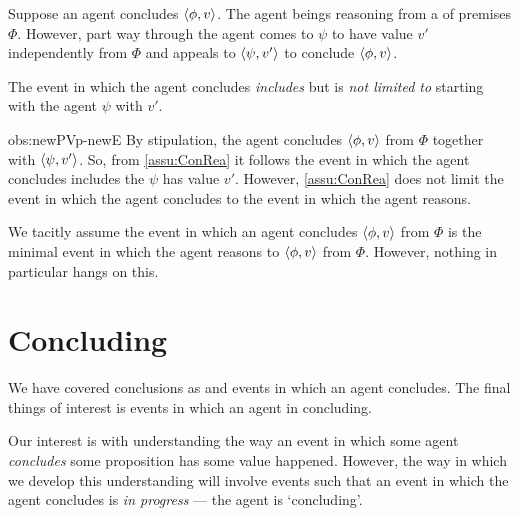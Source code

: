 \begin{note}
  \begin{observation}[Bounds]%
    \label{obs:newPVp-newE}%
    Suppose an agent concludes \(\langle \phi, v \rangle\).
    The agent beings reasoning from a \pool{} of premises \(\Phi\).
    However, part way through the agent comes to \eval{} \(\psi\) to have value \(v'\) independently from \(\Phi\) and appeals to \(\langle \psi, v' \rangle\) to conclude \(\langle \phi, v \rangle\).

    The event in which the agent concludes \emph{includes} but is \emph{not limited to} starting with the agent \evaling{} \(\psi\) with \(v'\).
  \end{observation}

  \begin{motivation}{obs:newPVp-newE}%
    By stipulation, the agent concludes \(\langle \phi, v \rangle\) from \(\Phi\) together with \(\langle \psi, v' \rangle\).
    So, from \autoref{assu:ConRea} it follows the event in which the agent concludes includes the \evalion{} \(\psi\) has value \(v'\).
    However, \autoref{assu:ConRea} does not limit the event in which the agent concludes to the event in which the agent reasons.
  \end{motivation}

  We tacitly assume the event in which an agent concludes \(\langle \phi, v \rangle\) from \(\Phi\) is the minimal event in which the agent reasons to \(\langle \phi, v \rangle\) from \(\Phi\).
  However, nothing in particular hangs on this.
\end{note}

\section{Concluding}
\label{cha:clar:sec:Cing}

\begin{note}
  We have covered conclusions as  and events in which an agent concludes.
  The final things of interest is events in which an agent in concluding.

  Our interest is with understanding the way an event in which some agent \emph{concludes} some proposition has some value happened.
  However, the way in which we develop this understanding will involve events such that an event in which the agent concludes is \emph{in progress} --- the agent is `concluding'.
\end{note}

